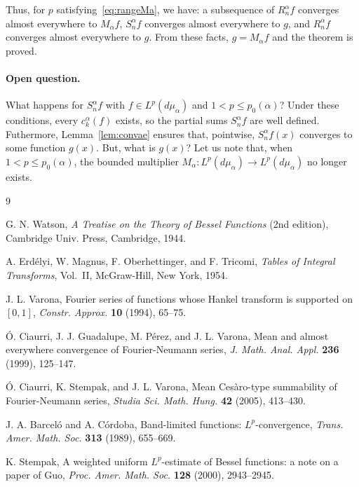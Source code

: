 \documentclass[10pt,a4paper]{article}
\newcommand{\ma}{M_{\alpha}}
\newcommand{\mua}{d\mu_\alpha}
\newcommand{\cka}{c_k^{\alpha}}
\newcommand{\Sna}{S_n^{\alpha}}
\newcommand{\Rna}{R_n^{\alpha}}
\theoremstyle{plain}
\begin{document}
Thus, for $p$ satisfying~\eqref{eq:rangeMa}, we have:
a subsequence of $\Rna f$ converges almost everywhere to $\ma f$,
$\Sna f$ converges almost everywhere to $g$,
and $\Rna f$ converges almost everywhere to $g$.
From these facts, $g = \ma f$ and the theorem is proved.

\paragraph{Open question.} What happens for $\Sna f$ with $f \in L^{p}(\mua)$ and $1 < p \le p_0(\alpha)$? Under these conditions, every $\cka(f)$ exists, so the partial sums $\Sna f$ are well defined. Futhermore, Lemma~\ref{lem:convae} ensures that, pointwise, $\Sna f(x)$ converges to some function $g(x)$. But, what is $g(x)$?
Let us note that, when $1 < p \le p_0(\alpha)$, the bounded multiplier $\ma: L^p(\mua) \to L^p(\mua)$ no longer exists.

\begin{thebibliography}{9}

 G. N. Watson,
\textit{A Treatise on the Theory of Bessel Functions} (2nd edition),
Cambridge Univ. Press,
Cambridge, 1944.

 A. Erd\'elyi, W. Magnus, F. Oberhettinger, and F. Tricomi,
\textit{Tables of Integral Transforms}, Vol.~II,
McGraw-Hill, New York, 1954.

 J. L. Varona,
{Fourier series of functions whose Hankel transform is supported on $[0,1]$},
\textit{Constr. Approx.}
\textbf{10} (1994), 65--75.

 \'O. Ciaurri, J. J. Guadalupe, M. P\'erez, and J. L. Varona,
{Mean and almost everywhere convergence of Fourier-Neumann series},
\textit{J. Math. Anal. Appl.}
\textbf{236} (1999), 125--147.

 \'O. Ciaurri, K. Stempak, and J. L. Varona,
{Mean Ces\`aro-type summability of Fourier-Neumann series},
\textit{Studia Sci. Math. Hung.}
\textbf{42} (2005), 413--430.

J. A. Barcel\'o and A. C\'ordoba, 
{Band-limited functions: $L^p$-convergence}, 
\textit{Trans. Amer. Math. Soc.} 
\textbf{313} (1989), 655--669.

 K. Stempak,
{A weighted uniform $L^p$-estimate of Bessel functions: a note on a paper of Guo},
\textit{Proc. Amer. Math. Soc.}
\textbf{128} (2000), 2943--2945.

\end{thebibliography}
\end{document}
